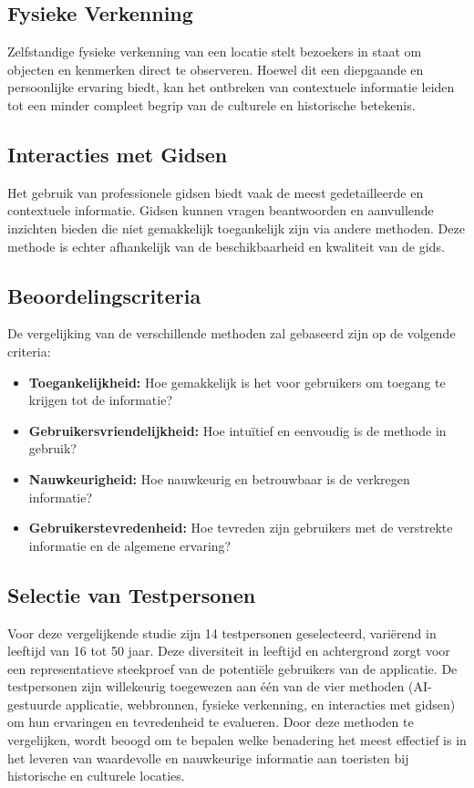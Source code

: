 \subsection{Fysieke Verkenning}
Zelfstandige fysieke verkenning van een locatie stelt bezoekers in staat om objecten en kenmerken direct te observeren. Hoewel dit een diepgaande en persoonlijke ervaring biedt, kan het ontbreken van contextuele informatie leiden tot een minder compleet begrip van de culturele en historische betekenis.

\subsection{Interacties met Gidsen}
Het gebruik van professionele gidsen biedt vaak de meest gedetailleerde en contextuele informatie. Gidsen kunnen vragen beantwoorden en aanvullende inzichten bieden die niet gemakkelijk toegankelijk zijn via andere methoden. Deze methode is echter afhankelijk van de beschikbaarheid en kwaliteit van de gids.

\subsection{Beoordelingscriteria}
De vergelijking van de verschillende methoden zal gebaseerd zijn op de volgende criteria:
\begin{itemize}
    \item \textbf{Toegankelijkheid:} Hoe gemakkelijk is het voor gebruikers om toegang te krijgen tot de informatie?
    \item \textbf{Gebruikersvriendelijkheid:} Hoe intuïtief en eenvoudig is de methode in gebruik?
    \item \textbf{Nauwkeurigheid:} Hoe nauwkeurig en betrouwbaar is de verkregen informatie?
    \item \textbf{Gebruikerstevredenheid:} Hoe tevreden zijn gebruikers met de verstrekte informatie en de algemene ervaring?
\end{itemize}

\subsection{Selectie van Testpersonen}
Voor deze vergelijkende studie zijn 14 testpersonen geselecteerd, variërend in leeftijd van 16 tot 50 jaar. Deze diversiteit in leeftijd en achtergrond zorgt voor een representatieve steekproef van de potentiële gebruikers van de applicatie. De testpersonen zijn willekeurig toegewezen aan één van de vier methoden (AI-gestuurde applicatie, webbronnen, fysieke verkenning, en interacties met gidsen) om hun ervaringen en tevredenheid te evalueren. Door deze methoden te vergelijken, wordt beoogd om te bepalen welke benadering het meest effectief is in het leveren van waardevolle en nauwkeurige informatie aan toeristen bij historische en culturele locaties.



